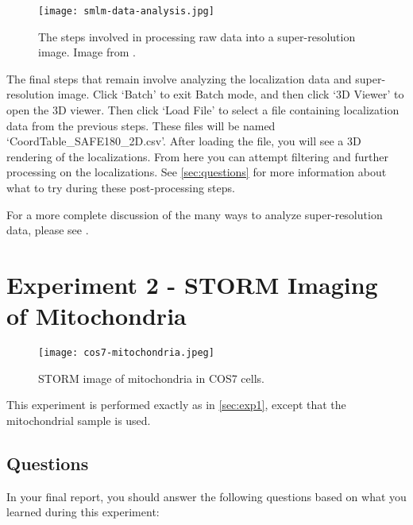 \documentclass[10pt,a4paper,oneside]{book}
\begin{document}
\begin{figure}
    \centering
    \texttt{[image: smlm-data-analysis.jpg]}
    \caption{The steps involved in processing raw data into a super-resolution image. Image from \cite{martens-frontiersinbioinformatics-2022}.}
    \label{fig:smlm-data-analysis}
\end{figure}

The final steps that remain involve analyzing the localization data and super-resolution image. Click `Batch' to exit Batch mode, and then click `3D Viewer' to open the 3D viewer. Then click `Load File' to select a file containing localization data from the previous steps. These files will be named `CoordTable\_SAFE180\_2D.csv'. After loading the file, you will see a 3D rendering of the localizations. From here you can attempt filtering and further processing on the localizations. See \autoref{sec:questions} for more information about what to try during these post-processing steps.

For a more complete discussion of the many ways to analyze super-resolution data, please see \cite{martens-frontiersinbioinformatics-2022}.

\section{Experiment 2 - STORM Imaging of Mitochondria}

\begin{figure}[ht]
    \centering
    \texttt{[image: cos7-mitochondria.jpeg]}
    \caption{STORM image of mitochondria in COS7 cells.}
    \label{fig:cos7-mitochondria}
\end{figure}

This experiment is performed exactly as in \autoref{sec:exp1}, except that the mitochondrial sample is used.

\subsection{Questions}\label{sec:questions}

In your final report, you should answer the following questions based on what you learned during this experiment:
\end{document}
